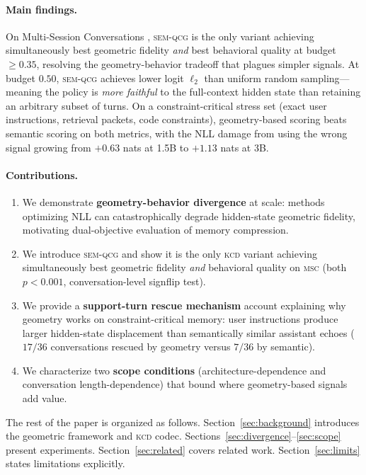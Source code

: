 \documentclass[11pt]{article}
\newcommand{\kcd}{\textsc{kcd}}
\newcommand{\semqcg}{\textsc{sem-qcg}}
\newcommand{\msc}{\textsc{msc}}
\begin{document}
\paragraph{Main findings.}
On Multi-Session Conversations \citep{xu-etal-2022-beyond},
\semqcg{} is the only variant achieving simultaneously best geometric fidelity
\emph{and} best behavioral quality at budget $\geq 0.35$,
resolving the geometry-behavior tradeoff that plagues simpler signals.
At budget $0.50$, \semqcg{} achieves lower logit $\ell_2$ than uniform
random sampling---meaning the policy is \emph{more faithful} to the
full-context hidden state than retaining an arbitrary subset of turns.
On a constraint-critical stress set
(exact user instructions, retrieval packets, code constraints),
geometry-based scoring beats semantic scoring on both metrics,
with the NLL damage from using the wrong signal growing from
$+0.63$ nats at 1.5B to $+1.13$ nats at 3B.

\paragraph{Contributions.}
\begin{enumerate}[leftmargin=1.5em,itemsep=2pt]
  \item We demonstrate \textbf{geometry-behavior divergence} at scale:
    methods optimizing NLL can catastrophically degrade hidden-state geometric
    fidelity, motivating dual-objective evaluation of memory compression.
  \item We introduce \semqcg{} and show it is the only \kcd{} variant achieving
    simultaneously best geometric fidelity \emph{and} behavioral quality on
    \msc{} (both $p{<}0.001$, conversation-level signflip test).
  \item We provide a \textbf{support-turn rescue mechanism} account explaining
    why geometry works on constraint-critical memory: user instructions produce
    larger hidden-state displacement than semantically similar assistant echoes
    ($17/36$ conversations rescued by geometry versus $7/36$ by semantic).
  \item We characterize two \textbf{scope conditions}
    (architecture-dependence and conversation length-dependence)
    that bound where geometry-based signals add value.
\end{enumerate}

The rest of the paper is organized as follows.
Section~\ref{sec:background} introduces the geometric framework and \kcd{} codec.
Sections~\ref{sec:divergence}--\ref{sec:scope} present experiments.
Section~\ref{sec:related} covers related work.
Section~\ref{sec:limits} states limitations explicitly.
\end{document}
